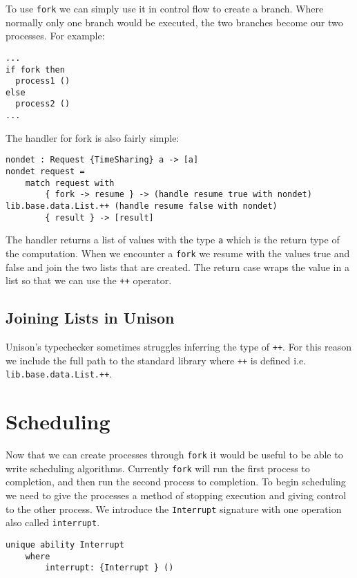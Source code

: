 \documentclass[logo,bsc,singlespacing,parskip]{infthesis}
\begin{document}
To use \texttt{fork} we can simply use it in control flow to create a branch.
Where normally only one branch would be executed, the two branches become our
two processes. For example:

\begin{lstlisting}[language=unison]
...
if fork then 
  process1 ()
else 
  process2 ()
...
\end{lstlisting}

The handler for fork is also fairly simple:

\begin{lstlisting}[language=unison]
nondet : Request {TimeSharing} a -> [a]
nondet request =
    match request with
        { fork -> resume } -> (handle resume true with nondet) lib.base.data.List.++ (handle resume false with nondet)
        { result } -> [result]
\end{lstlisting}

The handler returns a list of values with the type \texttt{a} which is the
return type of the computation. When we encounter a \texttt{fork} we resume
with the values true and false and join the two lists that are created. The
return case wraps the value in a list so that we can use the \texttt{++}
operator.

\subsection{Joining Lists in Unison}

Unison's typechecker sometimes struggles inferring the type of \texttt{++}. For
this reason we include the full path to the standard library where \texttt{++}
is defined i.e. \texttt{lib.base.data.List.++}.

\section{Scheduling}

Now that we can create processes through \texttt{fork} it would be useful to be able to write scheduling algorithms. Currently \texttt{fork} will run the first process to completion, and then run the second process to completion. To begin scheduling we need to give the processes a method of stopping execution and giving control to the other process. We introduce the \texttt{Interrupt} signature with one operation also called \texttt{interrupt}.

\begin{lstlisting}[language=unison]
unique ability Interrupt
    where
        interrupt: {Interrupt } ()
\end{lstlisting}
\end{document}
